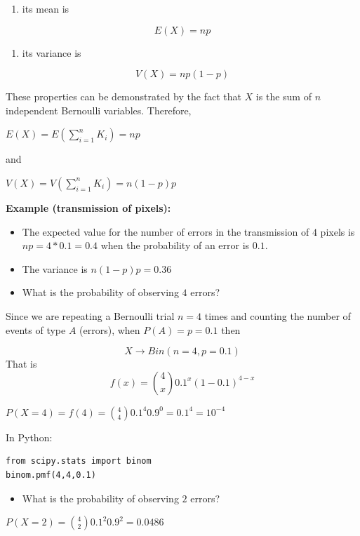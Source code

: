 \documentclass[
]{book}
\providecommand{\tightlist}{%
  \setlength{\itemsep}{0pt}\setlength{\parskip}{0pt}}
\begin{document}
\begin{enumerate}
\def\labelenumi{\arabic{enumi})}
\tightlist
\item
  its mean is
\end{enumerate}

\[E(X)=np\]

\begin{enumerate}
\def\labelenumi{\arabic{enumi})}
\setcounter{enumi}{1}
\tightlist
\item
  its variance is
\end{enumerate}

\[V(X)=np(1-p)\]

These properties can be demonstrated by the fact that \(X\) is the sum of \(n\) independent Bernoulli variables. Therefore,

\(E(X)=E(\sum_{i=1}^n K_i)=np\)

and

\(V(X)=V(\sum_{i=1}^n K_i)=n(1-p)p\)

\textbf{Example (transmission of pixels):}

\begin{itemize}
\item
  The expected value for the number of errors in the transmission of \(4\) pixels is \(np=4*0.1=0.4\) when the probability of an error is \(0.1\).
\item
  The variance is \(n(1-p)p=0.36\)
\item
  What is the probability of observing \(4\) errors?
\end{itemize}

Since we are repeating a Bernoulli trial \(n=4\) times and counting the number of events of type \(A\) (errors), when \(P(A)=p=0.1\) then

\[X \rightarrow Bin(n=4, p=0.1)\]
That is \[f(x)=\binom 4 x 0.1^x(1-0.1)^{4-x}\]

\(P(X=4)=f(4)=\binom 4 4 0.1^4 0.9^{0}=0.1^4=10^{-4}\)

In Python:

\begin{verbatim}
from scipy.stats import binom
binom.pmf(4,4,0.1)
\end{verbatim}

\begin{itemize}
\tightlist
\item
  What is the probability of observing \(2\) errors?
\end{itemize}

\(P(X=2)=\binom 4 2 0.1^2 0.9^2=0.0486\)
\end{document}
